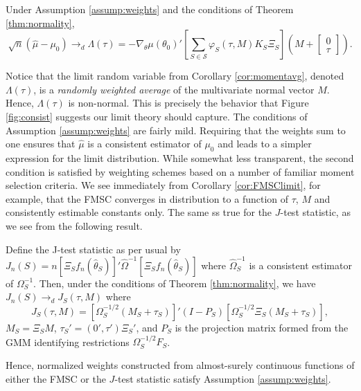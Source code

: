 \begin{cor}
\label{cor:momentavg}
Under Assumption \ref{assump:weights} and the conditions of Theorem \ref{thm:normality},
	$$\sqrt{n}\left(\widehat{\mu} -  \mu_0\right) \rightarrow_{d}\Lambda(\tau) =  -\nabla_\theta\mu(\theta_0)'\left[\sum_{S \in \mathscr{S}} \varphi_S(\tau,M) K_S\Xi_S\right] \left(M + \left[\begin{array}
	{c} 0 \\ \tau
\end{array} \right]\right).$$
\end{cor}
Notice that the limit random variable from Corollary \ref{cor:momentavg}, denoted $\Lambda(\tau)$, is a \emph{randomly weighted average} of the multivariate normal vector $M$. 
Hence, $\Lambda(\tau)$ is non-normal. 
This is precisely the behavior that Figure \ref{fig:consist} suggests our limit theory should capture.
The conditions of Assumption \ref{assump:weights} are fairly mild. 
Requiring that the weights sum to one ensures that $\widehat{\mu}$ is a consistent estimator of $\mu_0$ and leads to a simpler expression for the limit distribution. 
While somewhat less transparent, the second condition is satisfied by weighting schemes based on a number of familiar moment selection criteria.
We see immediately from Corollary \ref{cor:FMSClimit}, for example, that the FMSC converges in distribution to a function of $\tau$, $M$ and consistently estimable constants only. 
The same ss true for the $J$-test statistic, as we see from the following result. 
\begin{thm} 
\label{pro:jstat}
	Define the J-test statistic as per usual by $J_n(S)  = n \left[\Xi_S f_n(\widehat{\theta}_S)\right]' \widehat{\Omega}^{-1}\left[\Xi_S f_n(\widehat{\theta}_S)\right]$ where $\widehat{\Omega}^{-1}_S$ is a consistent estimator of $\Omega_S^{-1}$. Then, under the conditions of Theorem \ref{thm:normality}, we have $J_n(S) \rightarrow_dJ_S(\tau, M)$ where
		$$J_S(\tau, M)=[\Omega_S^{-1/2}(M_S + \tau_S)]' (I - P_S)[\Omega_S^{-1/2}\Xi_S(M_S + \tau_S)],$$
$M_S = \Xi_S M$, $\tau_S' = (0', \tau')\Xi_S'$, and $P_S$ is the projection matrix formed from the GMM identifying restrictions $\Omega^{-1/2}_S F_S$.
\end{thm}
Hence, normalized weights constructed from almost-surely continuous functions of either the FMSC or the $J$-test statistic satisfy Assumption \ref{assump:weights}. 

